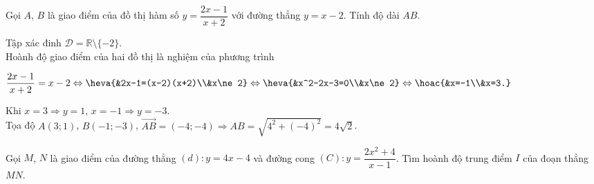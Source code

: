 \begin{bt}%

	Gọi $A$, $B$ là giao điểm của đồ thị hàm số $y=\dfrac{2x-1}{x+2}$ với đường thẳng $y=x-2$. Tính độ dài $AB$.
	\loigiai
	{Tập xác đinh $\mathscr{D}=\mathbb{R}\setminus \{-2\}$.\\
		Hoành độ giao điểm của hai đồ thị là nghiệm của phương trình
		\begin{center}
			$\dfrac{2x-1}{x+2}=x-2\Leftrightarrow \heva{&2x-1=(x-2)(x+2)\\&x\ne 2}\Leftrightarrow \heva{&x^2-2x-3=0\\&x\ne 2}\Leftrightarrow \hoac{&x=-1\\&x=3.}$
		\end{center}
		Khi $x=3\Rightarrow y=1$, $x=-1\Rightarrow y=-3$.\\
		Tọa độ $A(3;1)$, $B(-1;-3)$, $\overrightarrow{AB}=(-4;-4)\Rightarrow AB=\sqrt{4^2+(-4)^2}=4\sqrt{2}$.
	}
\end{bt}

\begin{bt}%

	Gọi $M$, $N$ là giao điểm của đường thẳng $(d)\colon y=4x-4$ và đường cong $(C)\colon y=\dfrac{2x^2+4}{x-1}$. Tìm hoành độ trung điểm $I$ của đoạn thẳng $MN$.
\end{bt}

